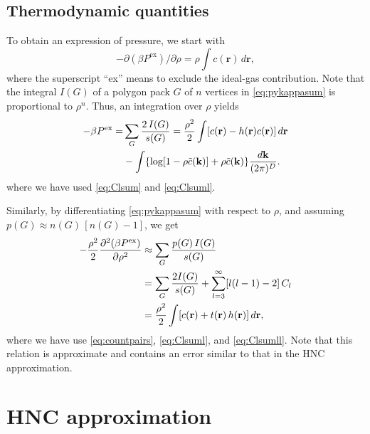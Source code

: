 \documentclass[aip,jcp,reprint,superscriptaddress]{revtex4-1}
\newcommand{\vct}[1]{\mathbf{#1}}
\providecommand{\vr}{} %
\renewcommand{\vr}{\vct{r}}
\newcommand{\vk}{\vct{k}}
\newcommand{\dvk}{\frac{d\vk}{(2\pi)^D}}
\newcommand{\supex}[1]{ { { #1 }^{ \mathrm{ex} } } }
\newcommand{\Pex}{\supex{P}}
\begin{document}
\subsection*{Thermodynamic quantities}


%
To obtain an expression of pressure,
  we start with\cite{hansen}
%
\begin{equation}
  -\partial (\beta P^{\mathrm{ex}}) / \partial \rho
  = \rho \int c(\vr) \, d\vr,
\label{eq:crcompr}
\end{equation}
%
where the superscript ``ex'' means to exclude the ideal-gas contribution.
%
Note that
  the integral $I(G)$ of a polygon pack $G$ of $n$ vertices
  in \eqref{eq:pykappasum}
  is proportional to $\rho^n$.
%
Thus, an integration over $\rho$ yields\cite{baxterpressure}
%
\begin{align}
      -\beta \Pex
  =&  \sum_{G} \frac{ 2 \, I(G) }{ s(G) }
  =   \frac{ \rho^2 }{ 2 }
      \int [c(\vr) - h(\vr) c(\vr)] \, d\vr \notag \\
  &
      -\int \{ \log[1 - \rho \tilde{c}(\vk)] + \rho \tilde{c}(\vk) \} \dvk.
\label{eq:baxterpressure}
\end{align}
%
where we have used \eqref{eq:Clsum} and \eqref{eq:Clsuml}.



Similarly,
  by differentiating \eqref{eq:pykappasum} with respect to $\rho$,
  and assuming $p(G) \approx n(G) \, [n(G) - 1]$,
  we get
%
\begin{align}
           -\frac{\rho^2}{2}
            \frac{\partial^2 ( \beta \Pex ) }
                 {\partial \rho^2}
  &\approx   \sum_G \frac{ p(G) \, I(G) }{ s(G) }
    \notag \\
  &=
            \sum_G \frac{2 I(G) }{s(G)}
            + \sum_{l = 3}^\infty [l(l-1) - 2] \, C_l
    \notag \\
  &=         \frac{\rho^2}{2} \int [c(\vr) + t(\vr) \, h(\vr) ] \, d\vr,
\label{eq:pyddpressure}
\end{align}
%
where we have use \eqref{eq:countpairs}, \eqref{eq:Clsuml}, and \eqref{eq:Clsumll}.
%
Note that this relation is approximate
  and contains an error
  similar to that in the HNC approximation.





\section{\label{sec:hnc}HNC approximation}
\end{document}

